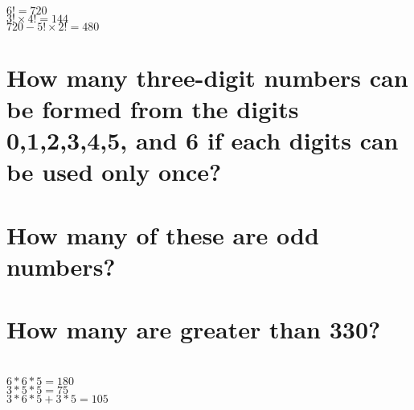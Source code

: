 \documentclass[answers]{exam}
\begin{document}
\begin{questions}
\begin{solution}
	\\$6! = 720$ \\
	$3! \times 4! = 144$ \\
	$720 - 5! \times 2! = 480$
\end{solution}

\question{}

\begin{parts}
	\part{How many three-digit numbers can be formed from the digits 0,1,2,3,4,5, and 6 if each digits can be used only once?}
	\part{How many of these are odd numbers?}
	\part{How many are greater than 330?}
\end{parts}

\begin{solution}
	\\$6*6*5 = 180$ \\
	$3*5*5 = 75$ \\
	$3*6*5 + 3*5 = 105$
\end{solution}

\end{questions}
\end{document}

